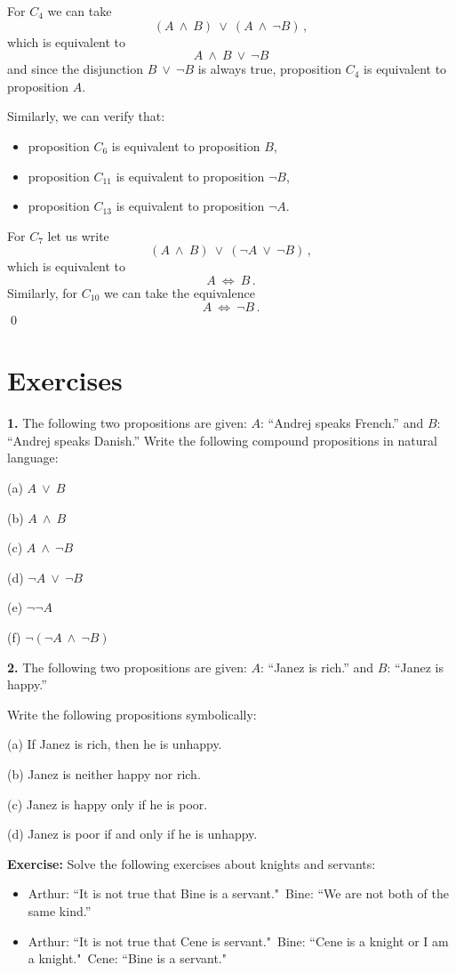 \documentclass[11pt,paper=b5,footinclude,headinclude]{scrbook} %
\def\ali {{~\vee~}}
\def\inn {{~\wedge~}}
\def\cee {{~\Leftrightarrow~}}
\theoremstyle{remark}
\theoremstyle{definition} %
\theoremstyle{theorem} %
\begin{document}
For $C_4$ we can take $$(A\inn B) \ali (A\inn \neg B)\,,$$
which is equivalent to
$$A\inn B \ali \neg B$$
and since the disjunction $B \ali \neg B$ is always true, proposition $C_4$ is equivalent to proposition $A$.

Similarly, we can verify that:
\begin{itemize}
	\item  proposition $C_6$ is equivalent to proposition $B$,
	\item  proposition $C_{11}$ is equivalent to proposition $\neg B$,
	\item  proposition $C_{13}$ is equivalent to proposition $\neg A$.
\end{itemize}
For $C_7$ let us write
$$(A\inn B) \ali (\neg A\ali \neg B)\,,$$
which is equivalent to
$$A\cee B\,.$$
Similarly, for $C_{10}$ we can take the equivalence
$$A\cee \neg B\,.$$
\qed


\section{Exercises}

\textbf{ 1.}
The following two propositions are given:
$A$: ``Andrej speaks French.'' and $B$: ``Andrej speaks Danish.''
Write the following compound propositions in natural language:

(a) $A\ali B$

(b) $A\inn B$

(c) $A\inn \neg B$

(d) $\neg A\ali \neg B$

(e) $\neg \neg A$

(f) $\neg (\neg A\inn \neg B)$

\medskip
\textbf{ 2.}
The following two propositions are given:
$A$: ``Janez is rich.'' and $B$: ``Janez is happy.''

Write the following propositions symbolically:

(a) If Janez is rich, then he is unhappy.

(b) Janez is neither happy nor rich.

(c) Janez is happy only if he is poor.

(d) Janez is poor if and only if he is unhappy.

\textbf{ Exercise:} Solve the following exercises about knights and servants:
\begin{itemize}
  \item Arthur: ``It is not true that Bine is a servant."~Bine: ``We are not both of the same kind.''
  \item Arthur: ``It is not true that Cene is servant."~Bine: ``Cene is a knight or I am a knight."~Cene: ``Bine is a servant."
\end{itemize}
\end{document}
